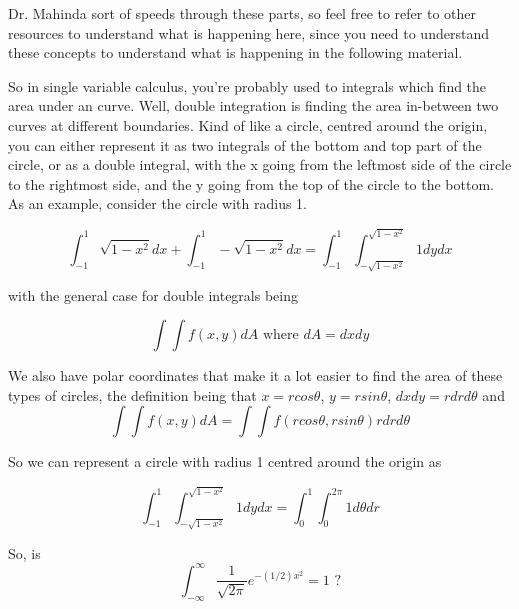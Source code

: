 \documentclass[12pt]{article}
\begin{document}
\begin{enumerate}
{	\begin{tcolorbox}[colback=red!5!white,colframe=red!75!black,title= Multivariable Calculus and Polar Coordinates Crash Course]
	
	Dr. Mahinda sort of speeds through these parts, so feel free to refer to other resources to understand what is happening here, since you need to understand these concepts to understand what is happening in the following material.
	
	\tcblower
	
	So in single variable calculus, you're probably used to integrals which find the area under an curve. Well, double integration is finding the area in-between two curves at different boundaries. Kind of like a circle, centred around the origin, you can either represent it as two integrals of the bottom and top part of the circle, or as a double integral, with the x going from the leftmost side of the circle to the rightmost side, and the y going from the top of the circle to the bottom. As an example, consider the circle with radius 1.
	
	$$\int^{1}_{-1} \sqrt{1 - x^2} dx + \int^{1}_{-1} -\sqrt{1 - x^2} dx = \int^{1}_{-1} \int^{\sqrt{1 - x^2}}_{-\sqrt{1 - x^2}}1 dy dx$$

	with the general case for double integrals being
	
	$$\int\int f(x,y) dA \text{ where } dA = dxdy$$
	
	We also have polar coordinates that make it a lot easier to find the area of these types of circles, the definition being that $x = rcos\theta$, $y = rsin\theta$, $dxdy = rdrd\theta$ and
	$$\int\int f(x,y) dA = \int\int f(rcos\theta, rsin\theta) rdrd\theta$$
	
	So we can represent a circle with radius 1 centred around the origin as
	
	$$\int^{1}_{-1} \int^{\sqrt{1 - x^2}}_{-\sqrt{1 - x^2}}1 dy dx = \int^{1}_{0}\int^{2\pi}_{0} 1 d\theta dr$$
	
	\end{tcolorbox}
	
	So, is $$\int^{\infty}_{-\infty} \frac{1}{\sqrt{2\pi}} e^{-(1/2)x^2} = 1 \text{ ?}$$
	
}
\end{enumerate}
\end{document}
